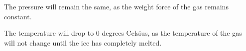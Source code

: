 The pressure will remain the same, as the weight force of the gas remains constant.

The temperature will drop to 0 degrees Celsius, as the temperature of the gas will not change until the ice has completely melted.